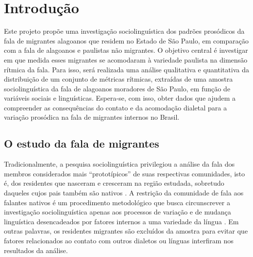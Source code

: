 \documentclass[
		a4paper,	%
		12pt,		%
		]{article}	%
\begin{document}
	\section{Introdução} 
	\label{intro}
	Este projeto propõe uma investigação sociolinguística dos padrões prosódicos 
	da fala de migrantes alagoanos que residem no Estado de São Paulo, em comparação com a fala de alagoanos e paulistas não migrantes. O
	objetivo central é investigar em que medida esses migrantes se acomodaram à
	variedade paulista na dimensão rítmica da fala. Para isso, será realizada
	uma análise qualitativa e quantitativa da distribuição de um conjunto de métricas
	rítmicas, extraídas de uma amostra sociolinguística da fala de alagoanos
	moradores de São Paulo, em função de variáveis sociais e linguísticas. 
	Espera-se, com isso, obter dados que ajudem a compreender as consequências
	do contato e da acomodação dialetal para a variação prosódica na fala de migrantes internos
	no Brasil.
	
	\subsection{O estudo da fala de migrantes}

	Tradicionalmente, a pesquisa sociolinguística privilegiou a análise da fala dos
	membros considerados mais \enquote{prototípicos} de suas respectivas
	comunidades, isto é, dos residentes que nasceram e cresceram na região estudada,
	sobretudo daqueles cujos pais também são nativos \citep{Britain2018,
	Oushiro2016, Milroy2002, Kerswill1993}. A restrição da comunidade de fala
	aos falantes nativos é um procedimento metodológico que busca circunscrever a
	investigação sociolinguística apenas aos processos de variação e de mudança
	linguística desencadeados por fatores internos a uma variedade da língua
	\citep[][p.  20]{Milroy2002, Labov2001}. Em outras palavras, os residentes
	migrantes são excluídos da amostra para evitar que fatores relacionados ao
	contato com outros dialetos ou línguas interfiram nos resultados da análise.
\end{document}
